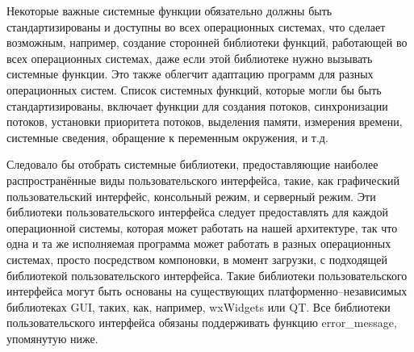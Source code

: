 \documentclass[forwardcom.tex]{subfiles}
\begin{document}
Некоторые важные системные функции обязательно должны быть стандартизированы и доступны во всех операционных системах, что сделает возможным, например, создание сторонней библиотеки функций, работающей во всех операционных системах, даже если этой библиотеке нужно вызывать системные функции. Это также облегчит адаптацию программ для разных операционных систем. Список системных функций, которые могли бы быть стандартизированы, включает функции для создания потоков, синхронизации потоков, установки приоритета потоков, выделения памяти, измерения времени, системные сведения, обращение к переменным окружения, и т.д.

Следовало бы отобрать системные библиотеки, предоставляющие наиболее распространённые виды пользовательского интерфейса, такие, как графический пользовательский интерфейс, консольный режим, и серверный режим. Эти библиотеки пользовательского интерфейса следует предоставлять для каждой операционной системы, которая может работать на нашей архитектуре, так что одна и та же исполняемая программа может работать в разных операционных системах, просто посредством компоновки, в момент загрузки, с подходящей библиотекой пользовательского интерфейса. Такие библиотеки пользовательского интерфейса могут быть основаны на существующих платформенно--независимых библиотеках GUI, таких, как, например, wxWidgets или QT. Все библиотеки пользовательского интерфейса обязаны поддерживать функцию error\_message, упомянутую ниже. 
\end{document}
